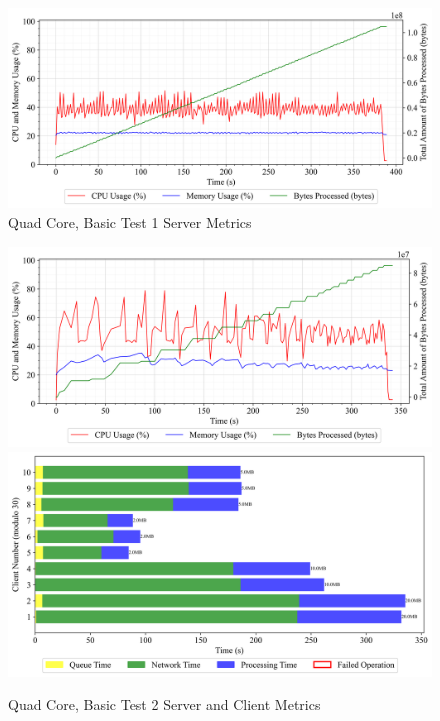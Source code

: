 \begin{figure}[h!t]
    \begin{center}
    \label{Fig:A1.9}
    \caption{Quad Core, Basic Test 1 Server Metrics}
    \includegraphics[width=\x\textwidth]{Chapter4/Results/4c_results/arty-a7-4c_basic_1_20241002_164824.db_server_metrics.png}
    \end{center}
\end{figure}

\begin{figure}[h!t]
    \begin{center}
    \label{Fig:A1.10}
    \caption{Quad Core, Basic Test 2 Server and Client Metrics}
    \includegraphics[width=\x\textwidth]{Chapter4/Results/4c_results/arty-a7-4c_basic_2_20241003_132631.db_server_metrics.png}
    \includegraphics[width=\x\textwidth]{Chapter4/Results/4c_results/arty-a7-4c_basic_2_20241003_132631.db_client_tasks.png}
    \end{center}
\end{figure}

